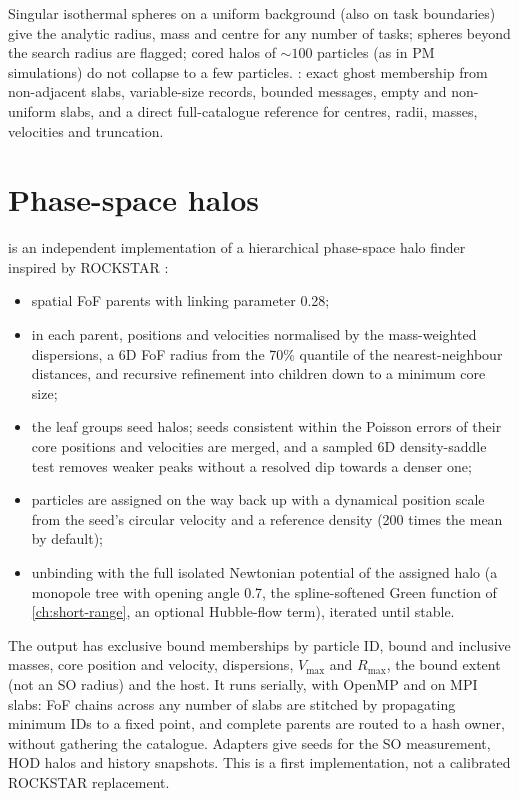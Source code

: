 \begin{validation}
Singular isothermal spheres on a uniform background (also on task boundaries) give the analytic radius, mass and centre for any number of
tasks; spheres beyond the search radius are flagged; cored halos of $\sim100$ particles (as in PM simulations) do not collapse to a few
particles. : exact ghost membership from non-adjacent slabs, variable-size records, bounded messages, empty
and non-uniform slabs, and a direct full-catalogue reference for centres, radii, masses, velocities and truncation.
\end{validation}

\section{Phase-space halos}\label{sec:halo-phasespace}

 is an independent implementation of a hierarchical phase-space halo finder inspired by ROCKSTAR
\cite{Behroozi2013}:
\begin{itemize}
\item spatial FoF parents with linking parameter 0.28;
\item in each parent, positions and velocities normalised by the mass-weighted dispersions, a 6D FoF radius from the 70\% quantile of the
      nearest-neighbour distances, and recursive refinement into children down to a minimum core size;
\item the leaf groups seed halos; seeds consistent within the Poisson errors of their core positions and velocities are merged, and a sampled
      6D density-saddle test removes weaker peaks without a resolved dip towards a denser one;
\item particles are assigned on the way back up with a dynamical position scale from the seed's circular velocity and a reference density
      (200 times the mean by default);
\item unbinding with the full isolated Newtonian potential of the assigned halo (a monopole tree with opening angle 0.7, the spline-softened
      Green function of \cref{ch:short-range}, an optional Hubble-flow term), iterated until stable.
\end{itemize}
The output has exclusive bound memberships by particle ID, bound and inclusive masses, core position and velocity, dispersions,
$V_{\max}$ and $R_{\max}$, the bound extent (not an SO radius) and the host. It runs serially, with OpenMP and on MPI slabs: FoF chains across
any number of slabs are stitched by propagating minimum IDs to a fixed point, and complete parents are routed to a hash owner, without
gathering the catalogue. Adapters give seeds for the SO measurement, HOD halos and history snapshots. This is a first implementation, not a
calibrated ROCKSTAR replacement.

